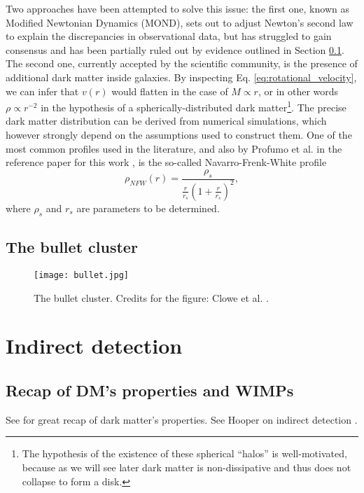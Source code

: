 Two approaches have been attempted to solve this issue: the first one, known as Modified Newtonian Dynamics (MOND), sets out to adjust Newton's second law to explain the discrepancies in observational data, but has struggled to gain consensus and has been partially ruled out by evidence outlined in Section \ref{sec:bullet}. The second one, currently accepted by the scientific community, is the presence of additional dark matter inside galaxies.
By inspecting Eq. \eqref{eq:rotational_velocity}, we can infer that \(v(r)\) would flatten in the case of \(M \propto r\), or in other words \(\rho \propto r^{-2} \) in the hypothesis of a spherically-distributed dark matter\footnote{The hypothesis of the existence of these spherical ``halos'' is well-motivated, because as we will see later dark matter is non-dissipative and thus does not collapse to form a disk.}. The precise dark matter distribution can be derived from numerical simulations, which however strongly depend on the assumptions used to construct them. One of the most common profiles used in the literature, and also by Profumo et al. in the reference paper for this work \cite{Profumo_2018}, is the so-called Navarro-Frenk-White profile
\begin{equation}
	\rho_{NFW} (r) = \frac{\rho _s}{\frac{r}{r_s}\left( 1+ \frac{r}{r_s} \right)^2 },
\end{equation}
where \(\rho _s\) and \(r_s\) are parameters to be determined.

\subsection{The bullet cluster}\label{sec:bullet}

\begin{figure}[htbp]
	\centering
	\texttt{[image: bullet.jpg]}
	\caption{The bullet cluster. Credits for the figure: Clowe et al. \cite{Clowe_2006}.}
	\label{fig:bullet}
\end{figure}

\section{Indirect detection}

\subsection{Recap of DM's properties and WIMPs}
See \cite{Cirelli_2024} for great recap of dark matter's properties.
See Hooper on indirect detection \cite{Hooper_2018}.

